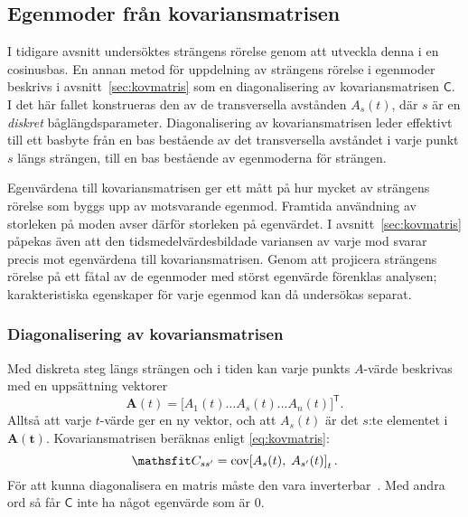 \subsection{Egenmoder från kovariansmatrisen}

I tidigare avsnitt undersöktes strängens rörelse genom att utveckla denna i en cosinusbas. En annan metod för uppdelning av strängens rörelse i egenmoder beskrivs i avsnitt~\ref{sec:kovmatris} som en diagonalisering av kovariansmatrisen $\mathsf{C}$. I det här fallet konstrueras den av de transversella avstånden $A_s(t)$, där $s$ är en \emph{diskret} båglängdsparameter. Diagonalisering av kovariansmatrisen leder effektivt till ett basbyte från en bas bestående av det transversella avståndet i varje punkt $s$ längs strängen, till en bas bestående av egenmoderna för strängen. 

Egenvärdena till kovariansmatrisen ger ett mått på hur mycket av strängens rörelse som byggs upp av motsvarande egenmod. Framtida användning av storleken på moden avser därför storleken på egenvärdet. I avsnitt~\ref{sec:kovmatris} påpekas även att den tidsmedelvärdesbildade variansen av varje mod svarar precis mot egenvärdena till kovariansmatrisen. Genom att projicera strängens rörelse på ett fåtal av de egenmoder med störst egenvärde förenklas analysen\cite{Shlens_PCA2014}; karakteristiska egenskaper för varje egenmod kan då undersökas separat. 

\subsubsection{Diagonalisering av kovariansmatrisen}
Med diskreta steg längs strängen och i tiden kan varje punkts $A$-värde beskrivas med en uppsättning vektorer
\begin{equation}
\mathbf{A}(t) 
= \Big[
A_1(t) \ldots A_s(t) \ldots A_n(t)
\Big]^\mathsf{T}.
\end{equation}
Alltså att varje $t$-värde ger en ny vektor, och att $A_s(t)$ är det $s$:te elementet i $\mathbf{A(t)}$. 
Kovariansmatrisen beräknas enligt \eqref{eq:kovmatris}:
\begin{equation} 
\label{eq:C}
    \mathsf{C}_{s s'} = \COV{A_s(t)}{A_{s'}(t)}_t.
\end{equation}
För att kunna diagonalisera en matris måste den vara inverterbar~\cite{Gustafsson_LaNa}. Med andra ord så får $\mathsf{C}$ inte ha något egenvärde som är $0$. 

